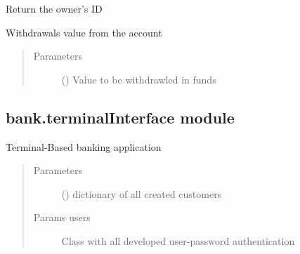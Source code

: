 \documentclass[letterpaper,10pt,english]{sphinxmanual}
\begin{document}

\begin{fulllineitems}
\label{\detokenize{bank:bank.terminalFunctions.whoami}}
Return the owner’s ID

\end{fulllineitems}


\begin{fulllineitems}
\label{\detokenize{bank:bank.terminalFunctions.withdrawal}}
Withdrawals value from the account
\begin{quote}\begin{description}
\item[{Parameters}] \leavevmode
{} () \textendash{} Value to be withdrawled in funds

\end{description}\end{quote}

\end{fulllineitems}



\subsection{bank.terminalInterface module}
\label{\detokenize{bank:module-bank.terminalInterface}}\label{\detokenize{bank:bank-terminalinterface-module}}

\begin{fulllineitems}
\label{\detokenize{bank:bank.terminalInterface.displayInterface}}
Terminal-Based banking application
\begin{quote}\begin{description}
\item[{Parameters}] \leavevmode
{} () \textendash{} dictionary of all created customers

\item[{Params users}] \leavevmode
Class with all developed user-password authentication

\end{description}\end{quote}

\end{fulllineitems}
\end{document}
